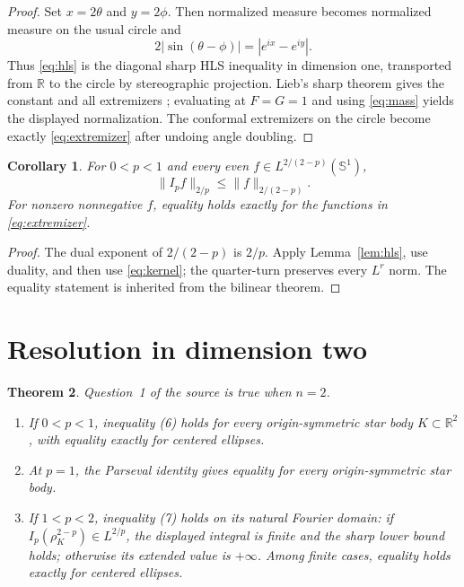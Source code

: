 \documentclass[10pt]{article}
\newtheorem{theorem}{Theorem}
\newtheorem{corollary}[theorem]{Corollary}
\newcommand{\Sph}{\mathbb S}
\newcommand{\R}{\mathbb R}
\begin{document}
\begin{proof}
Set $x=2\theta$ and $y=2\phi$.  Then normalized measure becomes normalized
measure on the usual circle and
\[
 2|\sin(\theta-\phi)|=|e^{ix}-e^{iy}|.
\]
Thus \eqref{eq:hls} is the diagonal sharp HLS inequality in dimension one,
transported from $\R$ to the circle by stereographic projection.  Lieb's
sharp theorem gives the constant and all extremizers \cite{Lieb}; evaluating
at $F=G=1$ and using \eqref{eq:mass} yields the displayed normalization.
The conformal extremizers on the circle become exactly
\eqref{eq:extremizer} after undoing angle doubling.
\end{proof}

\begin{corollary}\label{cor:operator}
For $0<p<1$ and every even $f\in L^{2/(2-p)}(\Sph^1)$,
\begin{equation}
 \|I_pf\|_{2/p}\leq\|f\|_{2/(2-p)}.
 \label{eq:operator}
\end{equation}
For nonzero nonnegative $f$, equality holds exactly for the functions in
\eqref{eq:extremizer}.
\end{corollary}

\begin{proof}
The dual exponent of $2/(2-p)$ is $2/p$.  Apply Lemma~\ref{lem:hls}, use
duality, and then use \eqref{eq:kernel}; the quarter-turn preserves every
$L^r$ norm.  The equality statement is inherited from the bilinear theorem.
\end{proof}

\section{Resolution in dimension two}

\begin{theorem}\label{thm:main}
Question~1 of the source is true when $n=2$.

\begin{enumerate}
\item If $0<p<1$, inequality (6) holds for every origin-symmetric star body
$K\subset\R^2$, with equality exactly for centered ellipses.
\item At $p=1$, the Parseval identity gives equality for every
origin-symmetric star body.
\item If $1<p<2$, inequality (7) holds on its natural Fourier domain: if
$I_p(\rho_K^{2-p})\in L^{2/p}$, the displayed integral is finite and the
sharp lower bound holds; otherwise its extended value is $+\infty$.  Among
finite cases, equality holds exactly for centered ellipses.
\end{enumerate}
\end{theorem}
\end{document}
